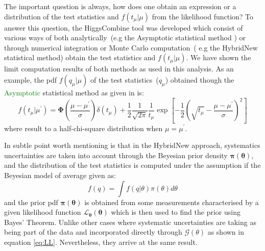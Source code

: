The important question is always, how does one obtain an expression or a distribution of the test statistics and $f(t_{\mu}|\mu)$ from the likelihood function? To answer this question, the HiggsCombine tool was developed which consist of various ways of both analytically~(e.g the Asymptotic statistical method \cite{ASYMP}) or through numerical integration or Monte Carlo computation~( e.g the HybridNew statistical method) obtain the test statistics and $ f(t_{\mu}|\mu)$. We have shown the limit computation results of both methods as used in this analysis.
As an example, the pdf $ f(q_{\mu}|\mu)$ of the test statistics~($q_{\mu}$) obtained though the \textcolor{green}{Asymptotic} statistical method as given in \cite{ASYMP} is:
\begin{equation}\label{eq:ASYPTOTIC}
f(t_{\mu}|{\mu}^{\prime}) = \mathbf{\Phi}\left( \frac{\mu -{\mu}^{\prime}}{\sigma}\right)\delta(t_{\mu}) +
                             \frac{1}{2}\frac{1}{\sqrt{2\pi}}\frac{1}{t_{\mu}}\exp\left[-\frac{1}{2} \left(  \sqrt{t_{\mu}} - \frac{\mu - {\mu}^{\prime}}{\sigma}\right)^{2} \right]
\end{equation}
where result to a half-chi-square distribution when $\mu = \mu^{\prime}$.

In subtle point worth mentioning is that in the HybridNew approach, systematics uncertainties are taken into account through the Beyesian prior density $\mathbf{\pi(\theta)}$, and the distribution of the test statistics is computed under the assumption if the Beyesian model of average given as: $$\displaystyle{f(q) = \int f(q|\theta)\pi(\theta)d\theta}$$ and the prior pdf $\mathbf{\pi(\theta)}$ is obtained from some measurements characterised by a given likelihood function $\mathcal{L}_{\mathbf{\theta}}(\mathbf{\theta} )$ which is then used to find the prior using Bayes' Theorem. Unlike other cases where systematic uncertainties are taking as being part of the data and incorporated directly through $\mathcal{G}(\theta)$ as shown in equation \ref{eq:LL}. Nevertheless, they arrive at the same result.

